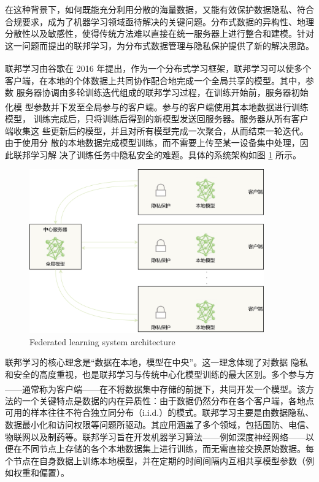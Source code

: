 在这种背景下，如何既能充分利用分散的海量数据，又能有效保护数据隐私、符合合规要求，成为了机器学习领域亟待解决的关键问题。分布式数据的异构性、地理分散性以及敏感性，使得传统方法难以直接在统一服务器上进行整合和建模。针对这一问题而提出的联邦学习，为分布式数据管理与隐私保护提供了新的解决思路。

联邦学习由谷歌在 2016 年提出\textsuperscript{\cite{konevcny2016federated}}，作为一个分布式学习框架，联邦学习可以使多个客户端，在本地的个体数据上共同协作配合地完成一个全局共享的模型。其中，参数 服务器协调由多轮训练迭代组成的联邦学习过程，在训练开始前，服务器初始化模 型参数并下发至全局参与的客户端\textsuperscript{\cite{mcmahan2017communication}}。参与的客户端使用其本地数据进行训练模型， 训练完成后，只将训练后得到的新模型发送回服务器。服务器从所有客户端收集这 些更新后的模型，并且对所有模型完成一次聚合，从而结束一轮迭代。由于使用分 散的本地数据完成模型训练，而不需要上传至某一设备集中处理，因此联邦学习解 决了训练任务中隐私安全的难题。具体的系统架构如图 \ref{FedArch} 所示。

\vspace{-0.1cm}
\begin{figure}[h]
	
	\centering
	\includegraphics[width=0.9\textwidth]{chapters/imgs/FedArch7} %
	{\wuhao Federated learning system architecture}
	\label{FedArch}
\end{figure}
\vspace{-0.35cm}

联邦学习的核心理念是“数据在本地，模型在中央”。这一理念体现了对数据 隐私和安全的高度重视，也是联邦学习与传统中心化模型训练的最大区别。多个参与方——通常称为客户端——在不将数据集中存储的前提下，共同开发一个模型\textsuperscript{\cite{kairouz2021advances}}。该方法的一个关键特点是数据的内在异质性：由于数据仍然分布在各个客户端，各地点可用的样本往往不符合独立同分布（i.i.d.）的模式。联邦学习主要是由数据隐私、数据最小化和访问权限等问题所驱动。其应用涵盖了多个领域，包括国防、电信、物联网以及制药等。联邦学习旨在开发机器学习算法——例如深度神经网络——以便在不同节点上存储的各个本地数据集上进行训练，而无需直接交换原始数据。每个节点在自身数据上训练本地模型，并在定期的时间间隔内互相共享模型参数（例如权重和偏置）。

